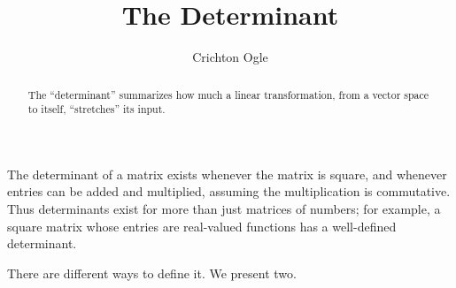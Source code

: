 \documentclass{ximera}
\title{The Determinant}
\author{Crichton Ogle}
\begin{document}
\begin{abstract}
  The ``determinant'' summarizes how much a linear transformation,
  from a vector space to itself, ``stretches'' its input.
\end{abstract}
\maketitle

The determinant of a matrix exists whenever the matrix is square, and
whenever entries can be added and multiplied, assuming the multiplication is commutative. Thus determinants exist
for more than just matrices of numbers; for example, a square matrix
whose entries are real-valued functions has a well-defined
determinant.

There are different ways to define it. We present two.
\end{document}
